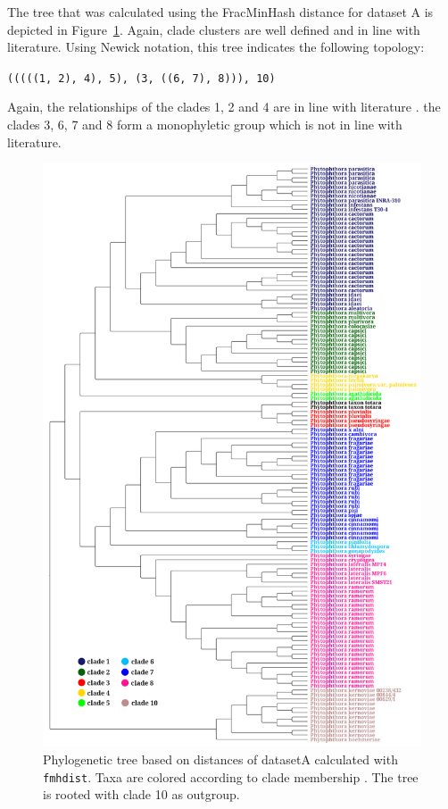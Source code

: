 The tree that was calculated using the FracMinHash distance for dataset A is
depicted in Figure~\ref{fig:mandalFmhdistTree}. Again, clade clusters are well
defined and in line with literature.
Using Newick notation, this tree indicates the following topology:

\texttt{(((((1, 2), 4), 5), (3, ((6, 7), 8))), 10)}

Again, the relationships of the clades 1, 2 and 4 are in line with literature
\cite{abadPhytophthoraTaxonomicPhylogenetic2023a,yangExpandedPhylogenyGenus2017}.
the clades 3, 6, 7 and 8 form a monophyletic group which is not in line with
literature.

\begin{figure}
  \centering
  \includegraphics[width=1.0\textwidth]{figures/fmhdist_mandal_tree_k21_s2000.png}
  \caption{Phylogenetic tree based on distances of datasetA calculated with
  \texttt{fmhdist}. Taxa are colored according to clade membership
  \cite{abadPhytophthoraTaxonomicPhylogenetic2023a}. The tree is rooted with
  clade 10 as outgroup.}
  \label{fig:mandalFmhdistTree}
\end{figure}

